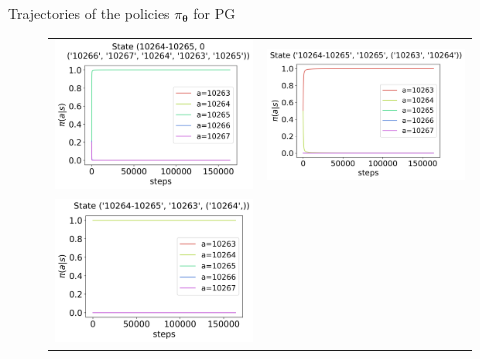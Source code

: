\documentclass[10pt, aspectratio=169, compress, protectframetitle, handout]{beamer}
\begin{document}
\begin{frame}{Trajectories of the policies $\pi_{\boldsymbol \theta}$ for PG}

    \begin{figure}
        \centering
        \begin{tabular}{cc}
            \includegraphics[scale=0.34,valign=b]{figures/policy_PG_state_0.png} &
            \includegraphics[scale=0.34,valign=b]{figures/policy_PG_state_1.png} \\
            \hspace*{-5pt}\includegraphics[scale=0.34,valign=b]{figures/policy_PG_state_2.png} &

\end{tabular}
\end{figure}
\end{frame}
\end{document}
